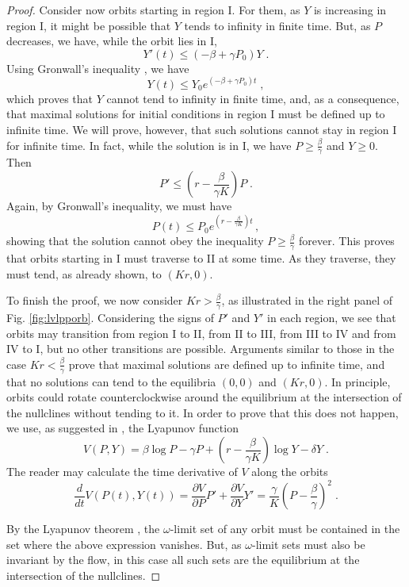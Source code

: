 \documentclass[12pt]{article}
\theoremstyle{definition}
\begin{document}
\begin{proof}
	Consider now orbits starting in region I. For them, as $Y$ is increasing in region I, it might be possible that $Y$ tends to infinity in finite time. But, as $P$ decreases, we have, while the orbit lies in I, 
	\[Y'(t) \leq (-\beta+ \gamma P_0)Y\;.\]
	Using Gronwall's inequality \cite{hirschsmaledevaney}, we have 
	\[Y(t) \leq Y_0 e^{(-\beta+ \gamma P_0)t}\;,\]
	which proves that $Y$ cannot tend to infinity in finite time, and, as a consequence, that maximal solutions for initial conditions in region I must be defined up to infinite time. We will prove, however, that such solutions cannot stay in region I for infinite time. In fact, while the solution is in I, we have $P \geq \frac{\beta}{\gamma}$ and $Y \geq 0$. Then 
	\[P'\leq (r- \frac{\beta}{\gamma K})P\;.\]
	Again, by Gronwall's inequality, we must have
	\[P(t) \leq P_0 e^{(r-\frac{\beta}{\gamma K})t}\,,\]
	showing that the solution cannot obey the inequality $P \geq \frac{\beta}{\gamma}$ forever. This proves that orbits starting in I must traverse to II at some time. As they traverse, they must tend, as already shown, to $(Kr,0)$.
	
	To finish the proof, we now consider $Kr > \frac{\beta}{\gamma}$, as illustrated in the right panel of Fig. \ref{fig:lvlpporb}. Considering the signs of $P'$ and $Y'$ in each region, we see that orbits may transition from region I to II, from II to III, from III to IV and from IV to I, but no other transitions are possible. Arguments similar to those in the case $Kr < \frac{\beta}{\gamma}$ prove that maximal solutions are defined up to infinite time, and that no solutions can tend to the equilibria $(0,0)$ and $(Kr,0)$. In principle, orbits could rotate counterclockwise around the equilibrium at the intersection of the nullclines without tending to it. In order to prove that this does not happen, we use, as suggested in \cite{hofsig}, the Lyapunov function
	\[V(P,Y)= \beta \log P- \gamma P+(r- \frac{\beta}{\gamma K}) \log Y- \delta Y\;.\]
	The reader may calculate the time derivative of $V$ along the orbits
	\[ \frac{d}{dt}V(P(t),Y(t)) = \frac{\partial V}{\partial P}P'+ \frac{\partial V}{\partial Y}Y'=\frac{\gamma}{K}(P- \frac{\beta}{\gamma})^2\;.\]
	
	By the Lyapunov theorem \cite{hofsig}, the $\omega$-limit set of any orbit must be contained in the set where the above expression vanishes. But, as $\omega$-limit sets must also be invariant by the flow, in this case all such sets are the equilibrium at the intersection of the nullclines.
\end{proof}
\end{document}
